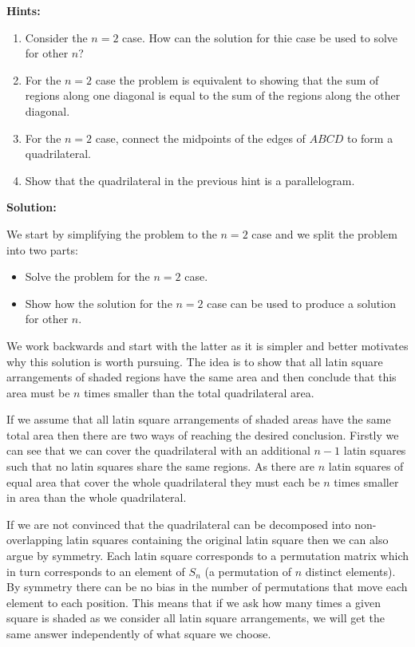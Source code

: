 \textbf{Hints:}

\begin{enumerate}
	\item Consider the $n = 2$ case. How can the solution for thie case be used to solve for other $n$?
	\item For the $n = 2$ case the problem is equivalent to showing that the sum of regions along one diagonal is equal to the sum of the regions along the other diagonal.
	\item For the $n = 2$ case, connect the midpoints of the edges of $ABCD$ to form a quadrilateral.
	\item Show that the quadrilateral in the previous hint is a parallelogram.
\end{enumerate}

\textbf{Solution:}

We start by simplifying the problem to the $n = 2$ case and we split the problem into two parts:

\begin{itemize}
	\item Solve the problem for the $n = 2$ case.
	\item Show how the solution for the $n = 2$ case can be used to produce a solution for other $n$.
\end{itemize}

We work backwards and start with the latter as it is simpler and better motivates why this solution is worth pursuing. The idea is to show that all latin square arrangements of shaded regions have the same area and then conclude that this area must be $n$ times smaller than the total quadrilateral area.

If we assume that all latin square arrangements of shaded areas have the same total area then there are two ways of reaching the desired conclusion. Firstly we can see that we can cover the quadrilateral with an additional $n - 1$ latin squares such that no latin squares share the same regions. As there are $n$ latin squares of equal area that cover the whole quadrilateral they must each be $n$ times smaller in area than the whole quadrilateral.

If we are not convinced that the quadrilateral can be decomposed into non-overlapping latin squares containing the original latin square then we can also argue by symmetry. Each latin square corresponds to a permutation matrix which in turn corresponds to an element of $S_n$ (a permutation of $n$ distinct elements). By symmetry there can be no bias in the number of permutations that move each element to each position. This means that if we ask how many times a given square is shaded as we consider all latin square arrangements, we will get the same answer independently of what square we choose.

